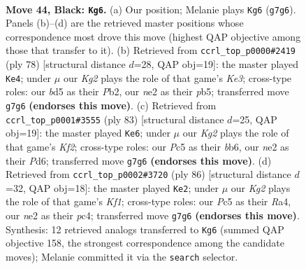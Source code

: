 \documentclass[11pt]{article}
\begin{document}
\clearpage

\begin{figure}[p]\centering
\begin{subfigure}{0.46\textwidth}\centering
\resizebox{\linewidth}{!}{%
\newchessgame
\chessboard[
  setfen={8/p3r1k1/r2p4/2pB4/2P3P1/7K/4NR2/8 b - - 1 44},
  showmover=false,
  pgfstyle=straightmove, color=movearrow, markmove={g7-g6}
]}
\caption{}
\end{subfigure}\hfill
\begin{subfigure}{0.46\textwidth}\centering
\resizebox{\linewidth}{!}{%
\newchessgame
\chessboard[
  setfen={8/8/4pk1p/1p1r4/5P2/PR2K2P/1P6/8 w - - 7 40},
  showmover=false,
  pgfstyle=straightmove, color=movearrow, markmove={e3-e4}
]}
\caption{}
\end{subfigure}
\\[4pt]
\begin{subfigure}{0.46\textwidth}\centering
\resizebox{\linewidth}{!}{%
\newchessgame
\chessboard[
  setfen={8/1p1r1k2/pB1p1p2/5N2/4r3/8/PP6/1K3R2 b - - 4 42},
  showmover=false,
  pgfstyle=straightmove, color=movearrow, markmove={f7-e6}
]}
\caption{}
\end{subfigure}\hfill
\begin{subfigure}{0.46\textwidth}\centering
\resizebox{\linewidth}{!}{%
\newchessgame
\chessboard[
  setfen={1r6/8/8/3kp3/RPp4r/P7/2R2P2/5K2 w - - 1 44},
  showmover=false,
  pgfstyle=straightmove, color=movearrow, markmove={f1-e2}
]}
\caption{}
\end{subfigure}
\caption{\textbf{Move 44, Black: \texttt{Kg6}.} (a) Our position; Melanie plays \texttt{Kg6} (\texttt{g7g6}). Panels (b)--(d) are the retrieved master positions whose correspondence most drove this move (highest QAP objective among those that transfer to it). (b) Retrieved from \texttt{ccrl\_top\_p0000\#2419} (ply 78) [structural distance $d$=28, QAP obj=19]: the master played \texttt{Ke4}; under $\mu$ our \emph{Kg2} plays the role of that game's \emph{Ke3}; cross-type roles: our \emph{b}d5 as their \emph{P}b2, our \emph{n}e2 as their \emph{p}b5; transferred move \texttt{g7g6} \textbf{(endorses this move)}. (c) Retrieved from \texttt{ccrl\_top\_p0001\#3555} (ply 83) [structural distance $d$=25, QAP obj=19]: the master played \texttt{Ke6}; under $\mu$ our \emph{Kg2} plays the role of that game's \emph{Kf2}; cross-type roles: our \emph{P}c5 as their \emph{b}b6, our \emph{n}e2 as their \emph{P}d6; transferred move \texttt{g7g6} \textbf{(endorses this move)}. (d) Retrieved from \texttt{ccrl\_top\_p0002\#3720} (ply 86) [structural distance $d$=32, QAP obj=18]: the master played \texttt{Ke2}; under $\mu$ our \emph{Kg2} plays the role of that game's \emph{Kf1}; cross-type roles: our \emph{P}c5 as their \emph{R}a4, our \emph{n}e2 as their \emph{p}c4; transferred move \texttt{g7g6} \textbf{(endorses this move)}. Synthesis: 12 retrieved analogs transferred to \texttt{Kg6} (summed QAP objective 158, the strongest correspondence among the candidate moves); Melanie committed it via the \texttt{search} selector.}
\label{fig:thought-m87}
\end{figure}
\end{document}
